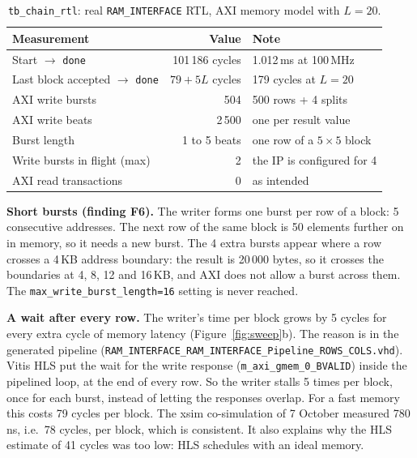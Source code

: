 \documentclass[11pt,a4paper]{article}
\newcommand{\code}[1]{\texttt{#1}}
\begin{document}
\begin{table}[h]
\centering
\begin{tabularx}{\textwidth}{@{}Yrl@{}}
\toprule
\textbf{Measurement} & \textbf{Value} & \textbf{Note} \\
\midrule
Start $\rightarrow$ \code{done} & 101\,186 cycles & 1.012\,ms at 100\,MHz \\
Last block accepted $\rightarrow$ \code{done} & $79 + 5L$ cycles & 179 cycles at $L = 20$ \\
AXI write bursts & 504 & 500 rows + 4 splits \\
AXI write beats & 2\,500 & one per result value \\
Burst length & 1 to 5 beats & one row of a $5\times5$ block \\
Write bursts in flight (max) & 2 & the IP is configured for 4 \\
AXI read transactions & 0 & as intended \\
\bottomrule
\end{tabularx}
\caption{\code{tb\_chain\_rtl}: real \code{RAM\_INTERFACE} RTL, AXI memory model with $L = 20$.}
\label{tab:rtl}
\end{table}

\textbf{Short bursts (finding F6).} The writer forms one burst per row of a block: 5 consecutive addresses. The next row of the same block is 50 elements further on in memory, so it needs a new burst. The 4 extra bursts appear where a row crosses a 4\,KB address boundary: the result is 20\,000 bytes, so it crosses the boundaries at 4, 8, 12 and 16\,KB, and AXI does not allow a burst across them. The \code{max\_write\_burst\_length=16} setting is never reached.

\textbf{A wait after every row.} The writer's time per block grows by 5 cycles for every extra cycle of memory latency (Figure~\ref{fig:sweep}b). The reason is in the generated pipeline (\code{RAM\_INTERFACE\_RAM\_INTERFACE\_Pipeline\_ROWS\_COLS.vhd}). Vitis HLS put the wait for the write response (\code{m\_axi\_gmem\_0\_BVALID}) inside the pipelined loop, at the end of every row. So the writer stalls 5 times per block, once for each burst, instead of letting the responses overlap. For a fast memory this costs 79 cycles per block. The xsim co-simulation of 7 October measured 780\,ns, i.e.\ 78 cycles, per block, which is consistent. It also explains why the HLS estimate of 41 cycles was too low: HLS schedules with an ideal memory.
\end{document}
